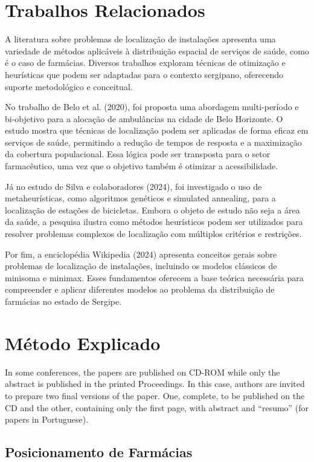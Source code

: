 \documentclass[12pt]{article}
\begin{document}
\section{Trabalhos Relacionados}

A literatura sobre problemas de localização de instalações apresenta uma variedade de métodos aplicáveis à distribuição espacial de serviços de saúde, como é o caso de farmácias. Diversos trabalhos exploram técnicas de otimização e heurísticas que podem ser adaptadas para o contexto sergipano, oferecendo suporte metodológico e conceitual.

No trabalho de Belo et al. (2020), foi proposta uma abordagem multi-período e bi-objetivo para a alocação de ambulâncias na cidade de Belo Horizonte. O estudo mostra que técnicas de localização podem ser aplicadas de forma eficaz em serviços de saúde, permitindo a redução de tempos de resposta e a maximização da cobertura populacional. Essa lógica pode ser transposta para o setor farmacêutico, uma vez que o objetivo também é otimizar a acessibilidade.

Já no estudo de Silva e colaboradores (2024), foi investigado o uso de metaheurísticas, como algoritmos genéticos e simulated annealing, para a localização de estações de bicicletas. Embora o objeto de estudo não seja a área da saúde, a pesquisa ilustra como métodos heurísticos podem ser utilizados para resolver problemas complexos de localização com múltiplos critérios e restrições.

Por fim, a enciclopédia Wikipedia (2024) apresenta conceitos gerais sobre problemas de localização de instalações, incluindo os modelos clássicos de minisoma e minimax. Esses fundamentos oferecem a base teórica necessária para compreender e aplicar diferentes modelos ao problema da distribuição de farmácias no estado de Sergipe.

\section{Método Explicado}

In some conferences, the papers are published on CD-ROM while only the
abstract is published in the printed Proceedings. In this case, authors are
invited to prepare two final versions of the paper. One, complete, to be
published on the CD and the other, containing only the first page, with
abstract and ``resumo'' (for papers in Portuguese).

\subsection{Posicionamento de Farmácias}
\end{document}
